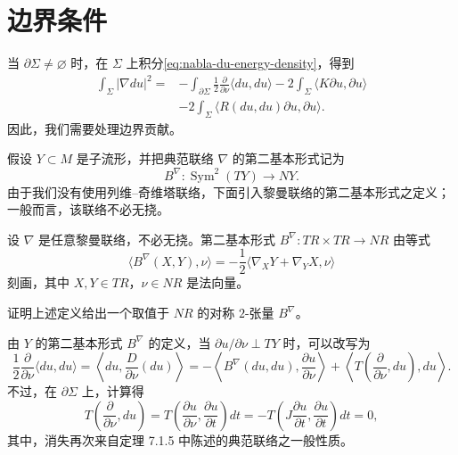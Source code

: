 \section{边界条件}
\label{sec:boundary-conditions-geometric-calculations}

当 $\partial\Sigma\ne\varnothing$ 时，在 $\Sigma$ 上积分\eqref{eq:nabla-du-energy-density}，得到
\begin{equation}
\begin{split}
 \int_\Sigma|\nabla du|^2
 ={}&-\int_{\partial\Sigma}\frac12\frac\partial{\partial\nu}
       \langle du,du\rangle
 -2\int_\Sigma\langle K\partial u,\partial u\rangle\\
 &-2\int_\Sigma\langle R(du,du)\partial u,\partial u\rangle.
\end{split}
 \label{eq:boundary-integrated-bochner}
\end{equation}
因此，我们需要处理边界贡献。

假设 $Y\subset M$ 是子流形，并把典范联络 $\nabla$ 的第二基本形式记为
\[
 B^\nabla:\operatorname{Sym}^2(TY)\longrightarrow NY.
\]
由于我们没有使用列维--奇维塔联络，下面引入黎曼联络的第二基本形式之定义；一般而言，该联络不必无挠。

\begin{definition}\label{def:second-fundamental-form-metric-connection}
设 $\nabla$ 是任意黎曼联络，不必无挠。第二基本形式
$B^\nabla:TR\times TR\to NR$ 由等式
\[
 \langle B^\nabla(X,Y),\nu\rangle
 =-\frac12\langle\nabla_XY+\nabla_YX,\nu\rangle
\]
刻画，其中 $X,Y\in TR$，$\nu\in NR$ 是法向量。
\end{definition}

\begin{exercise}\label{ex:second-fundamental-form-symmetric}
证明上述定义给出一个取值于 $NR$ 的对称 $2$-张量 $B^\nabla$。
\end{exercise}

由 $Y$ 的第二基本形式 $B^\nabla$ 的定义，当
$\partial u/\partial\nu\perp TY$ 时，可以改写为
\[
 \frac12\frac\partial{\partial\nu}\langle du,du\rangle
 =\left\langle du,\frac D{\partial\nu}(du)\right\rangle
 =-\left\langle B^\nabla(du,du),\frac{\partial u}{\partial\nu}\right\rangle
 +\left\langle T\left(\frac\partial{\partial\nu},du\right),du\right\rangle.
\]
不过，在 $\partial\Sigma$ 上，计算得
\[
 T\left(\frac\partial{\partial\nu},du\right)
 =T\left(\frac{\partial u}{\partial\nu},
          \frac{\partial u}{\partial t}\right)dt
 =-T\left(J\frac{\partial u}{\partial t},
          \frac{\partial u}{\partial t}\right)dt=0,
\]
其中，消失再次来自定理 7.1.5 中陈述的典范联络之一般性质。

